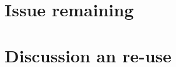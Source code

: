 \documentclass[12pt]{article}
\begin{document}
\section{Issue remaining}


\section{Discussion an re-use}
\end{document}
